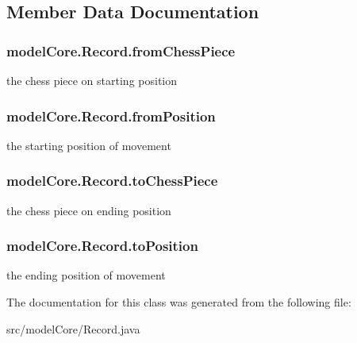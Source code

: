 \subsection{Member Data Documentation}
\hypertarget{classmodel_core_1_1_record_a38bcd5a97552a51ac6c3e657a2d59c77}{
\subsubsection[{from\+Chess\+Piece}]{ model\+Core.\+Record.\+from\+Chess\+Piece}}\label{classmodel_core_1_1_record_a38bcd5a97552a51ac6c3e657a2d59c77}
the chess piece on starting position \hypertarget{classmodel_core_1_1_record_ae7cca522f71f0fb7b5e25b9c3fe00e46}{
\subsubsection[{from\+Position}]{ model\+Core.\+Record.\+from\+Position}}\label{classmodel_core_1_1_record_ae7cca522f71f0fb7b5e25b9c3fe00e46}
the starting position of movement \hypertarget{classmodel_core_1_1_record_abdc3856c453073728a148a4aec3a91e9}{
\subsubsection[{to\+Chess\+Piece}]{ model\+Core.\+Record.\+to\+Chess\+Piece}}\label{classmodel_core_1_1_record_abdc3856c453073728a148a4aec3a91e9}
the chess piece on ending position \hypertarget{classmodel_core_1_1_record_a9beacb5341758e83ebe459f71b6e2511}{
\subsubsection[{to\+Position}]{ model\+Core.\+Record.\+to\+Position}}\label{classmodel_core_1_1_record_a9beacb5341758e83ebe459f71b6e2511}
the ending position of movement 

The documentation for this class was generated from the following file\+:\begin{DoxyCompactItemize}
\item 
src/model\+Core/Record.\+java\end{DoxyCompactItemize}

